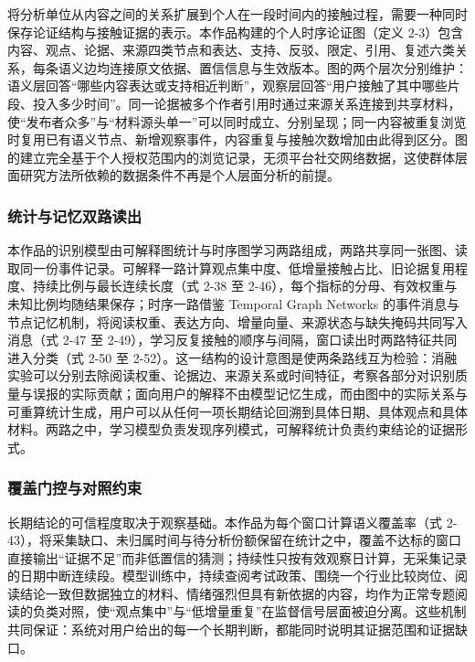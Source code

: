 将分析单位从内容之间的关系扩展到个人在一段时间内的接触过程，需要一种同时保存论证结构与接触证据的表示。本作品构建的个人时序论证图（定义 2-3）包含内容、观点、论据、来源四类节点和表达、支持、反驳、限定、引用、复述六类关系，每条语义边均连接原文依据、置信信息与生效版本。图的两个层次分别维护：语义层回答``哪些内容表达或支持相近判断''，观察层回答``用户接触了其中哪些片段、投入多少时间''。同一论据被多个作者引用时通过来源关系连接到共享材料，使``发布者众多''与``材料源头单一''可以同时成立、分别呈现；同一内容被重复浏览时复用已有语义节点、新增观察事件，内容重复与接触次数增加由此得到区分。图的建立完全基于个人授权范围内的浏览记录，无须平台社交网络数据，这使群体层面研究方法\cite{ref1,ref3}所依赖的数据条件不再是个人层面分析的前提。

\subsubsection{统计与记忆双路读出}\label{section:4.4.2}

本作品的识别模型由可解释图统计与时序图学习两路组成，两路共享同一张图、读取同一份事件记录。可解释一路计算观点集中度、低增量接触占比、旧论据复用程度、持续比例与最长连续长度（式 2-38 至 2-46），每个指标的分母、有效权重与未知比例均随结果保存；时序一路借鉴 Temporal Graph Networks 的事件消息与节点记忆机制\cite{ref16}，将阅读权重、表达方向、增量向量、来源状态与缺失掩码共同写入消息（式 2-47 至 2-49），学习反复接触的顺序与间隔，窗口读出时两路特征共同进入分类（式 2-50 至 2-52）。这一结构的设计意图是使两条路线互为检验：消融实验可以分别去除阅读权重、论据边、来源关系或时间特征，考察各部分对识别质量与误报的实际贡献；面向用户的解释不由模型记忆生成，而由图中的实际关系与可重算统计生成，用户可以从任何一项长期结论回溯到具体日期、具体观点和具体材料。两路之中，学习模型负责发现序列模式，可解释统计负责约束结论的证据形式。

\subsubsection{覆盖门控与对照约束}\label{section:4.4.3}

长期结论的可信程度取决于观察基础。本作品为每个窗口计算语义覆盖率（式 2-43），将采集缺口、未归属时间与待分析份额保留在统计之中，覆盖不达标的窗口直接输出``证据不足''而非低置信的猜测；持续性只按有效观察日计算，无采集记录的日期中断连续段。模型训练中，持续查阅考试政策、围绕一个行业比较岗位、阅读结论一致但数据独立的材料、情绪强烈但具有新依据的内容，均作为正常专题阅读的负类对照，使``观点集中''与``低增量重复''在监督信号层面被迫分离。这些机制共同保证：系统对用户给出的每一个长期判断，都能同时说明其证据范围和证据缺口。

